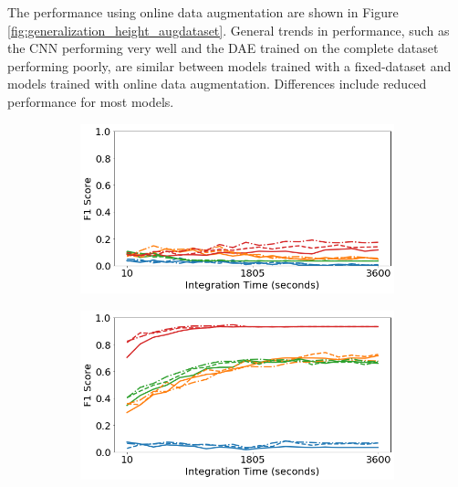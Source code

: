 The performance using online data augmentation are shown in Figure \ref{fig:generalization_height_augdataset}. General trends in performance, such as the CNN performing very well and the DAE trained on the complete dataset performing poorly, are similar between models trained with a fixed-dataset and models trained with online data augmentation. Differences include reduced performance for most models.

\begin{figure}[H]
     \centering
     \begin{subfigure}[b]{0.49\textwidth}
         \centering
         \includegraphics[width=\textwidth]{images/generalization-height-aug-easy-01.png}
         \caption{}
         \label{fig:generalization-height-aug-easy-01}
     \end{subfigure}
     \hfill
     \begin{subfigure}[b]{0.49\textwidth}
         \centering
         \includegraphics[width=\textwidth]{images/generalization-height-aug-easy-05.png}
         \caption{}
         \label{fig:generalization-height-aug-easy-05}
     \end{subfigure}


\end{figure}
